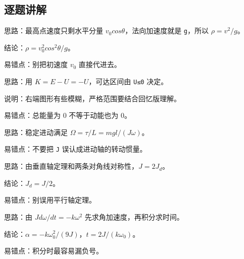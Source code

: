 \documentclass[12pt,a4paper]{ctexart}
\begin{document}
\subsection*{逐题讲解}

\begin{tcolorbox}[colback=white,colframe=black!55,title={一-1. 斜抛体在最高点求曲率半径}]
思路：最高点速度只剩水平分量 \(v_0 cosθ\)，法向加速度就是 \texttt{g}，所以 \(ρ=v^2/g\)。\par
结论：\(ρ=v_0^2 cos^2θ/g\)。\par
易错点：别把初速度 \(v_0\) 直接代进去。\par
\end{tcolorbox}

\begin{tcolorbox}[colback=white,colframe=black!55,title={一-2. 已知势能曲线和总能量 \(E=0\)，求运动范围与 \(x_0\) 处动能}]
思路：用 \(K=E-U=-U\)，可达区间由 \texttt{U≤0} 决定。\par
说明：右端图形有些模糊，严格范围要结合回忆版理解。\par
易错点：总能量为 0 不等于动能也为 0。\par
\end{tcolorbox}

\begin{tcolorbox}[colback=white,colframe=black!55,title={一-3. 高速自转陀螺在水平面内进动，求进动角速度}]
思路：稳定进动满足 \(Ω=τ/L=mgl/(Jω)\)。\par
易错点：不要把 \texttt{J} 误认成进动轴的转动惯量。\par
\end{tcolorbox}

\begin{tcolorbox}[colback=white,colframe=black!55,title={一-4. 正方形均匀薄板已知过中心垂直板面的转动惯量为 \texttt{J}，求以对角线为轴的转动惯量}]
思路：由垂直轴定理和两条对角线对称性，\(J=2J_d\)。\par
结论：\(J_d=J/2\)。\par
易错点：别误用平行轴定理。\par
\end{tcolorbox}

\begin{tcolorbox}[colback=white,colframe=black!55,title={一-5. 飞轮受阻力矩 \(M∝ω^2\) 减速，求 \(ω=ω_0/3\) 时的角加速度和已历时间}]
思路：由 \(J dω/dt=-kω^2\) 先求角加速度，再积分求时间。\par
结论：\(α=-kω_0^2/(9J)\)，\(t=2J/(kω_0)\)。\par
易错点：积分时最容易漏负号。\par
\end{tcolorbox}
\end{document}

